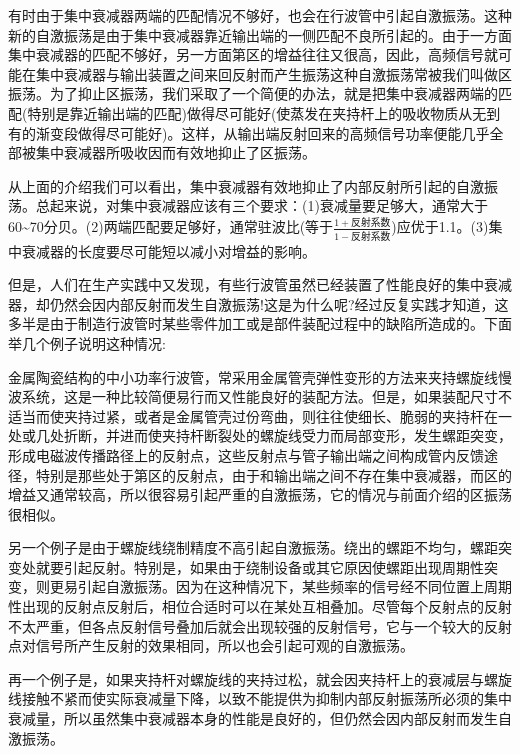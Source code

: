 有时由于集中衰减器两端的匹配情况不够好，也会在行波管中引起自激振荡。这种新的自激振荡是由于集中衰减器靠近输出端的一侧匹配不良所引起的。由于一方面集中衰减器的匹配不够好，另一方面第\uppercase\expandafter{}区的增益往往又很高，因此，高频信号就可能在集中衰减器与输出装置之间来回反射而产生振荡这种自激振荡常被我们叫做\uppercase\expandafter{}区振荡。为了抑止\uppercase\expandafter{}区振荡，我们采取了一个简便的办法，就是把集中衰减器两端的匹配(特别是靠近输出端的匹配)做得尽可能好(使蒸发在夹持杆上的吸收物质从无到有的渐变段做得尽可能好)。这样，从输出端反射回来的高频信号功率便能几乎全部被集中衰减器所吸收因而有效地抑止了\uppercase\expandafter{}区振荡。


从上面的介绍我们可以看出，集中衰减器有效地抑止了内部反射所引起的自激振荡。总起来说，对集中衰减器应该有三个要求：(1)衰减量要足够大，通常大于60\textasciitilde70分贝。(2)两端匹配要足够好，通常驻波比(等于$ \frac{1+\textrm{反射系数}}{1-\textrm{反射系数}} $)应优于1.1。(3)集中衰减器的长度要尽可能短以减小对增益的影响。


但是，人们在生产实践中又发现，有些行波管虽然已经装置了性能良好的集中衰减器，却仍然会因内部反射而发生自激振荡!这是为什么呢?经过反复实践才知道，这多半是由于制造行波管时某些零件加工或是部件装配过程中的缺陷所造成的。下面举几个例子说明这种情况:


金属陶瓷结构的中小功率行波管，常采用金属管壳弹性变形的方法来夹持螺旋线慢波系统，这是一种比较简便易行而又性能良好的装配方法。但是，如果装配尺寸不适当而使夹持过紧，或者是金属管壳过份弯曲，则往往使细长、脆弱的夹持杆在一处或几处折断，并进而使夹持杆断裂处的螺旋线受力而局部变形，发生螺距突变，形成电磁波传播路径上的反射点，这些反射点与管子输出端之间构成管内反馈途径，特别是那些处于第\uppercase\expandafter{}区的反射点，由于和输出端之间不存在集中衰减器，而\uppercase\expandafter{}区的增益又通常较高，所以很容易引起严重的自激振荡，它的情况与前面介绍的\uppercase\expandafter{}区振荡很相似。


另一个例子是由于螺旋线绕制精度不高引起自激振荡。绕出的螺距不均匀，螺距突变处就要引起反射。特别是，如果由于绕制设备或其它原因使螺距出现周期性突变，则更易引起自激振荡。因为在这种情况下，某些频率的信号经不同位置上周期性出现的反射点反射后，相位合适时可以在某处互相叠加。尽管每个反射点的反射不太严重，但各点反射信号叠加后就会出现较强的反射信号，它与一个较大的反射点对信号所产生反射的效果相同，所以也会引起可观的自激振荡。


再一个例子是，如果夹持杆对螺旋线的夹持过松，就会因夹持杆上的衰减层与螺旋线接触不紧而使实际衰减量下降，以致不能提供为抑制内部反射振荡所必须的集中衰减量，所以虽然集中衰减器本身的性能是良好的，但仍然会因内部反射而发生自激振荡。


